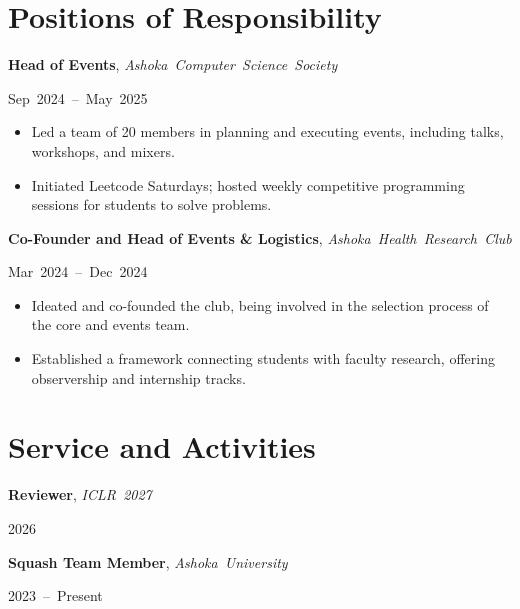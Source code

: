 \documentclass[11pt,letterpaper]{article}
\newlength{\datewidth}
\newcommand{\heading}[3]{%
  \settowidth{\datewidth}{#3}%
  \par\vspace{2pt}\parbox[t]{\dimexpr\linewidth-\datewidth-1em}{\raggedright\textbf{#1}, \mbox{\textit{#2}}}%
  \hfill\mbox{#3}\par}
\newenvironment{bullets}
  {\begin{itemize}[leftmargin=1.2em,label=\textbullet,itemsep=0pt,parsep=0pt,topsep=0pt,partopsep=0pt]}
  {\end{itemize}}
\begin{document}
\section{Positions of Responsibility}
\heading{Head of Events}{Ashoka Computer Science Society}{Sep 2024 -- May 2025}
\begin{bullets}
  \item Led a team of 20 members in planning and executing events, including talks, workshops, and mixers.
  \item Initiated Leetcode Saturdays; hosted weekly competitive programming sessions for students to solve problems.
\end{bullets}

\heading{Co-Founder and Head of Events \& Logistics}{Ashoka Health Research Club}{Mar 2024 -- Dec 2024}
\begin{bullets}
  \item Ideated and co-founded the club, being involved in the selection process of the core and events team.
  \item Established a framework connecting students with faculty research, offering observership and internship tracks.
\end{bullets}

\section{Service and Activities}
\heading{Reviewer}{ICLR 2027}{2026}
\heading{Squash Team Member}{Ashoka University}{2023 -- Present}
\end{document}
